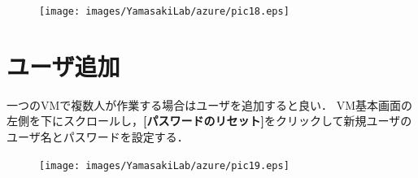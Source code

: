 \begin{figure}[ht]
	\begin{center}
		\texttt{[image: images/YamasakiLab/azure/pic18.eps]}
	\end{center}
\end{figure}

\section*{ユーザ追加}
一つのVMで複数人が作業する場合はユーザを追加すると良い．
VM基本画面の左側を下にスクロールし，{\bf[パスワードのリセット]}をクリックして新規ユーザのユーザ名とパスワードを設定する．

\begin{figure}[ht]
	\begin{center}
		\texttt{[image: images/YamasakiLab/azure/pic19.eps]}
	\end{center}
\end{figure}